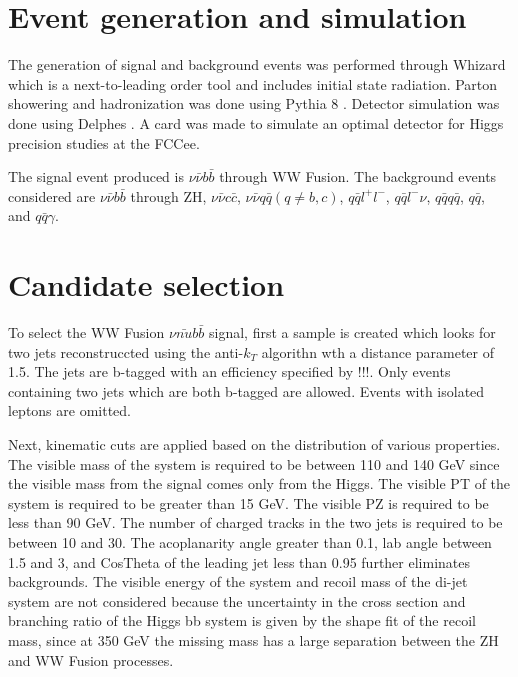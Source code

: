 \documentclass[preprintnumbers,nofootinbib,noshowpacs,eqsecnum,prd,superscriptaddress,letterpaper]{revtex4}
\begin{document}
\section{Event generation and simulation}
\label{sec:samples}

The generation of signal and background events was performed through Whizard \cite{whizard} which is a next-to-leading order tool and includes initial state radiation. Parton showering and hadronization was done using Pythia 8 \cite{pythia}. Detector simulation was done using Delphes \cite{delphes}. A card was made to simulate an optimal detector for Higgs precision studies at the FCCee. 

The signal event produced is $\nu\bar{\nu}b\bar{b}$ through WW Fusion. The background events considered are $\nu\bar{\nu}b\bar{b}$ through ZH, $\nu\bar{\nu}c\bar{c}$, $\nu\bar{\nu}q\bar{q} (q\neq b,c)$, $q\bar{q}l^+l^-$, $q\bar{q}l^-\nu$, $q\bar{q}q\bar{q}$, $q\bar{q}$, and $q\bar{q}\gamma$.  

\section{Candidate selection}
\label{sec:selection}

To select the WW Fusion $\nu\bar{nu}b\bar{b}$ signal, first a sample is created which looks for two jets reconstruccted using the anti-$k_T$ algorithn wth a distance parameter of 1.5. The jets are b-tagged with an efficiency specified by !!!. Only events containing two jets which are both b-tagged are allowed. Events with isolated leptons are omitted. 

Next, kinematic cuts are applied based on the distribution of various properties. The visible mass of the system is required to be between 110 and 140 GeV since the visible mass from the signal comes only from the Higgs. The visible PT of the system is required to be greater than 15 GeV. The visible PZ is required to be less than 90 GeV. The number of charged tracks in the two jets is required to be between 10 and 30. The acoplanarity angle greater than 0.1, lab angle between 1.5 and 3, and CosTheta of the leading jet less than 0.95 further eliminates backgrounds. The visible energy of the system and recoil mass of the di-jet system are not considered because the uncertainty in the cross section and branching ratio of the Higgs bb system is given by the shape fit of the recoil mass, since at 350 GeV the missing mass has a large separation between the ZH and WW Fusion processes. 
\end{document}

